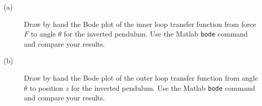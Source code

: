 
\begin{description}
\item[(a)] Draw by hand the Bode plot of the inner loop transfer function from force $F$ to angle $\theta$ for the inverted pendulum.
Use the Matlab \texttt{bode} command and compare your results.
\item[(b)] Draw by hand the Bode plot of the outer loop transfer function from angle $\theta$ to position $z$ for the inverted pendulum.
Use the Matlab \texttt{bode} command and compare your results.
\end{description}